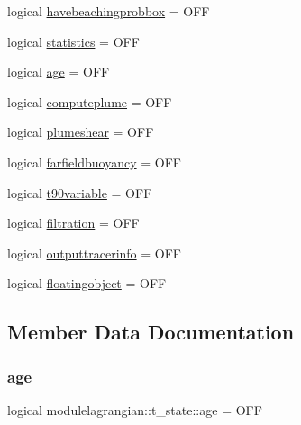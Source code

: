 \begin{DoxyCompactItemize}
\item 
logical \mbox{\hyperlink{structmodulelagrangian_1_1t__state_a84b8d88f1ce01e15c76320755a02a15f}{havebeachingprobbox}} = O\+FF
\item 
logical \mbox{\hyperlink{structmodulelagrangian_1_1t__state_a9494c91cffaf978059022ebb68155c9d}{statistics}} = O\+FF
\item 
logical \mbox{\hyperlink{structmodulelagrangian_1_1t__state_acaed697c0bf55231f9d3183b9930b264}{age}} = O\+FF
\item 
logical \mbox{\hyperlink{structmodulelagrangian_1_1t__state_aacdc24626dfe94802a77d1ff48dc638e}{computeplume}} = O\+FF
\item 
logical \mbox{\hyperlink{structmodulelagrangian_1_1t__state_a18ed8a6a80369df2ee8b92d099b4f166}{plumeshear}} = O\+FF
\item 
logical \mbox{\hyperlink{structmodulelagrangian_1_1t__state_a49adf1161c6294253c819dff785061bf}{farfieldbuoyancy}} = O\+FF
\item 
logical \mbox{\hyperlink{structmodulelagrangian_1_1t__state_abb2ce05992932441277577eb0890bc16}{t90variable}} = O\+FF
\item 
logical \mbox{\hyperlink{structmodulelagrangian_1_1t__state_ae41affe70fe6a88d0cdb54d9a085aa0f}{filtration}} = O\+FF
\item 
logical \mbox{\hyperlink{structmodulelagrangian_1_1t__state_a701fd5a7916f552089f6a44711407ac8}{outputtracerinfo}} = O\+FF
\item 
logical \mbox{\hyperlink{structmodulelagrangian_1_1t__state_a8865e4d9ba8805539c04491be7a53c97}{floatingobject}} = O\+FF
\end{DoxyCompactItemize}


\subsection{Member Data Documentation}
\mbox{\label{structmodulelagrangian_1_1t__state_acaed697c0bf55231f9d3183b9930b264}} 
\subsubsection{\texorpdfstring{age}{age}}
{\footnotesize\ttfamily logical modulelagrangian\+::t\+\_\+state\+::age = O\+FF\hspace{0.3cm}{\ttfamily [private]}}

